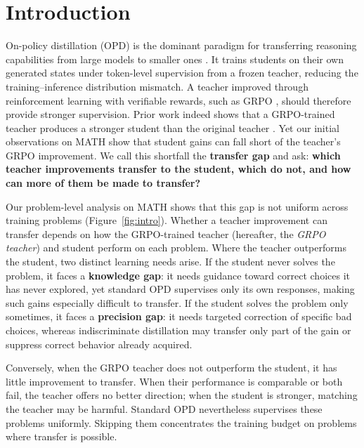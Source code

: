 \documentclass[10pt]{article}
\begin{document}
\section{Introduction}

On-policy distillation (OPD) is the dominant paradigm for transferring
reasoning capabilities from large models to smaller ones
\citep{agarwal2024opd,gu2024minillm}. It trains students on their own generated
states under token-level supervision from a frozen teacher, reducing the
training--inference distribution mismatch. A teacher improved through
reinforcement learning with verifiable rewards, such as GRPO
\citep{shao2024deepseekmath,guo2025deepseekr1}, should therefore provide stronger
supervision. Prior work indeed shows that a GRPO-trained teacher produces a
stronger student than the original teacher \citep{sang2026beyond}. Yet our
initial observations on MATH \citep{hendrycks2021math} show that student gains
can fall short of the teacher's GRPO improvement. We call this shortfall the
\textbf{transfer gap} and ask: \textbf{which teacher improvements transfer to
the student, which do not, and how can more of them be made to transfer?}

Our problem-level analysis on MATH shows that this gap is not uniform across
training problems (Figure~\ref{fig:intro}). Whether a teacher improvement can
transfer depends on how the GRPO-trained teacher (hereafter, the \emph{GRPO
teacher}) and student perform on each problem. Where the teacher outperforms
the student, two distinct learning needs arise. If the student never solves
the problem, it faces a \textbf{knowledge gap}: it needs guidance toward
correct choices it has never explored, yet standard OPD supervises only its
own responses, making such gains especially difficult to transfer. If the
student solves the problem only sometimes, it faces a \textbf{precision gap}:
it needs targeted correction of specific bad choices, whereas indiscriminate
distillation may transfer only part of the gain or suppress correct behavior
already acquired.

Conversely, when the GRPO teacher does not outperform the student, it has
little improvement to transfer. When their performance is comparable or both
fail, the teacher offers no better direction; when the student is stronger,
matching the teacher may be harmful. Standard OPD nevertheless supervises
these problems uniformly. Skipping them concentrates the training budget on
problems where transfer is possible.
\end{document}
